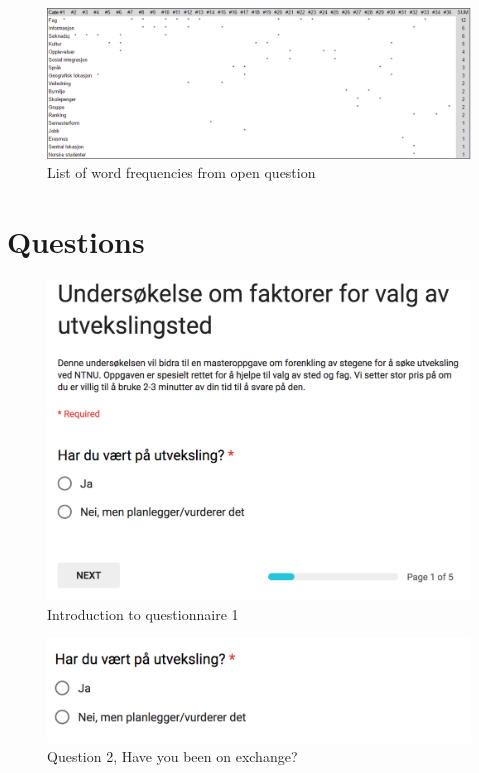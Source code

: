 \FloatBarrier
\label{appendix:word_frequency}

\begin{figure}[h]
    \centering
    \includegraphics[width=1.0\textwidth]{fig/word_freq.png}
    \caption[]{List of word frequencies from open question}
    \label{fig:word_frequency}
\end{figure}

\FloatBarrier
\section{Questions} \label{app:questionnaire1_questions}

\begin{figure}[h]
    \centering
\includegraphics[width=1\textwidth]{fig/form1/intro.png}
    \caption[]{Introduction to questionnaire 1}
    \label{fig:q11}
\end{figure}

\begin{figure}[h]
    \centering
    
\includegraphics[width=1\textwidth]{fig/form1/exchange.png}
    \caption[]{Question 2, Have you been on exchange?}
    \label{fig:q12}
\end{figure}


